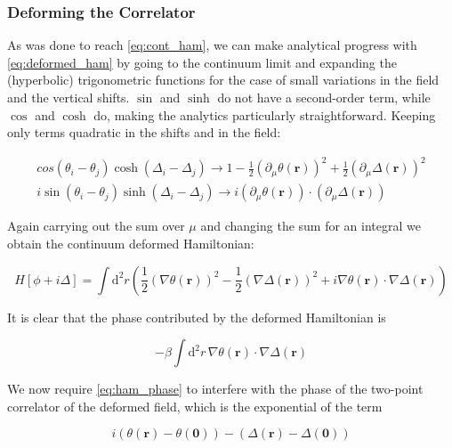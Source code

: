 \documentclass[12pt]{article}
\begin{document}
\subsubsection{Deforming the Correlator}

As was done to reach \ref{eq:cont_ham}, we can make analytical progress with \ref{eq:deformed_ham} by going to the continuum limit and
expanding the (hyperbolic) trigonometric functions for the case of small variations in the field and the vertical shifts. $\sin$ and $\sinh$ do not
have a second-order term, while $\cos$ and $\cosh$ do, making the analytics particularly straightforward. Keeping only terms quadratic
in the shifts and in the field:

\begin{equation}
	\begin{split}
		cos(\theta_i-\theta_j)\cosh(\Delta_i-\Delta_j) \rightarrow 1 - \frac{1}{2}(\partial_\mu \theta(\mathbf{r}))^2 + \frac{1}{2}(\partial_\mu \Delta(\mathbf{r}))^2 \\
		i \sin(\theta_i-\theta_j)\sinh(\Delta_i-\Delta_j) \rightarrow i(\partial_\mu \theta(\mathbf{r})) \cdot (\partial_\mu \Delta(\mathbf{r}))
	\end{split}
\end{equation}

Again carrying out the sum over $\mu$ and changing the sum for an integral we obtain the continuum deformed Hamiltonian:

\begin{equation}
	H[\phi + i\Delta] = \int \mathrm{d}^2r \left(\frac{1}{2}(\nabla \theta(\mathbf{r}))^2 - \frac{1}{2}(\nabla \Delta(\mathbf{r}))^2 + i \nabla\theta(\mathbf{r}) \cdot \nabla\Delta(\mathbf{r}) \right)
\end{equation}

It is clear that the phase contributed by the deformed Hamiltonian is 

\begin{equation} \label{eq:ham_phase}
	{-\beta\int\mathrm{d}^2r \, \nabla\theta(\mathbf{r})\cdot\nabla\Delta(\mathbf{r})}
\end{equation}

We now require \ref{eq:ham_phase} to interfere with the phase of the two-point correlator of the deformed field, which is 
the exponential of the term

\begin{equation}
	i(\theta(\mathbf{r}) - \theta(\mathbf{0})) -(\Delta(\mathbf{r}) - \Delta(\mathbf{0}))
\end{equation}
\end{document}
